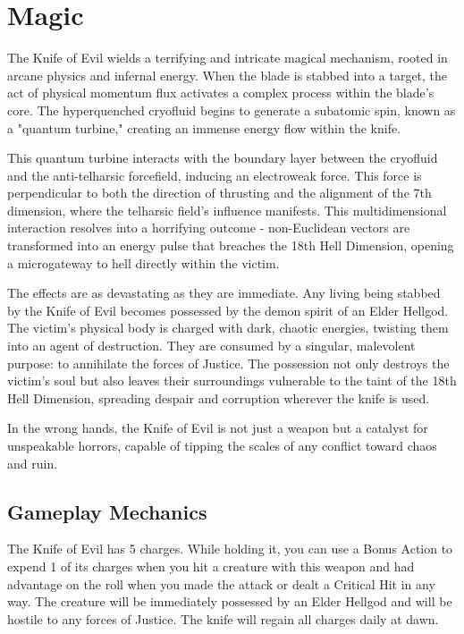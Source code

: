 \section*{Magic}
{\entryfont The Knife of Evil wields a terrifying and intricate magical mechanism, rooted in arcane physics and infernal energy. When the blade is stabbed into a target, the act of physical momentum flux activates a complex process within the blade's core. The hyperquenched cryofluid begins to generate a subatomic spin, known as a "quantum turbine," creating an immense energy flow within the knife.

This quantum turbine interacts with the boundary layer between the cryofluid and the anti-telharsic forcefield, inducing an electroweak force. This force is perpendicular to both the direction of thrusting and the alignment of the 7th dimension, where the telharsic field's influence manifests. This multidimensional interaction resolves into a horrifying outcome - non-Euclidean vectors are transformed into an energy pulse that breaches the 18th Hell Dimension, opening a microgateway to hell directly within the victim.

The effects are as devastating as they are immediate. Any living being stabbed by the Knife of Evil becomes possessed by the demon spirit of an Elder Hellgod. The victim's physical body is charged with dark, chaotic energies, twisting them into an agent of destruction. They are consumed by a singular, malevolent purpose: to annihilate the forces of Justice. The possession not only destroys the victim's soul but also leaves their surroundings vulnerable to the taint of the 18th Hell Dimension, spreading despair and corruption wherever the knife is used.

In the wrong hands, the Knife of Evil is not just a weapon but a catalyst for unspeakable horrors, capable of tipping the scales of any conflict toward chaos and ruin.}

\subsection*{Gameplay Mechanics}
{\entryfont The Knife of Evil has 5 charges. While holding it, you can use a Bonus Action to expend 1 of its charges when you hit a creature with this weapon and had advantage on the roll when you made the attack or dealt a Critical Hit in any way. The creature will be immediately possessed by an Elder Hellgod and will be hostile to any forces of Justice. The knife will regain all charges daily at dawn.}